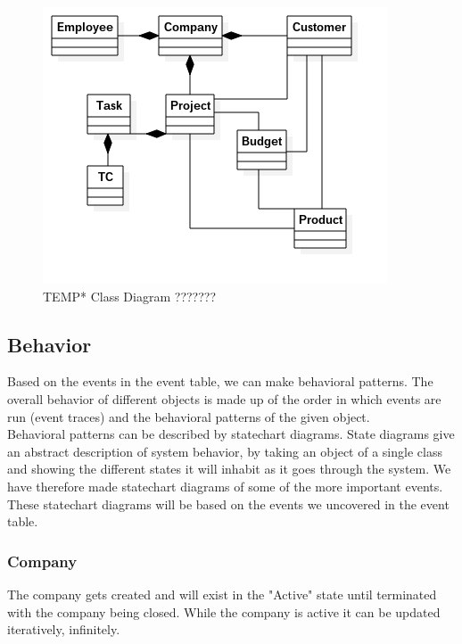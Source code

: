 \begin{figure}[H]
    \centering
    \includegraphics[scale=0.7]{Images/ProblemDomain/classDiagram.png}
    \caption{TEMP*  Class Diagram ???????}
    \label{fig:Class Diagram}
\end{figure}

\subsection{Behavior}

Based on the events in the event table, we can make behavioral patterns. The overall behavior of different objects is made up of the order in which events are run (event traces) and the behavioral patterns of the given object. %
\\
Behavioral patterns can be described by statechart diagrams. State diagrams give an abstract description of system behavior, by taking an object of a single class and showing the different states it will inhabit as it goes through the system.
We have therefore made statechart diagrams of some of the more important events. These statechart diagrams will be based on the events we uncovered in the event table.

\subsubsection*{Company}

The company gets created and will exist in the "Active" state until terminated with the company being closed.
While the company is active it can be updated iteratively, infinitely.

